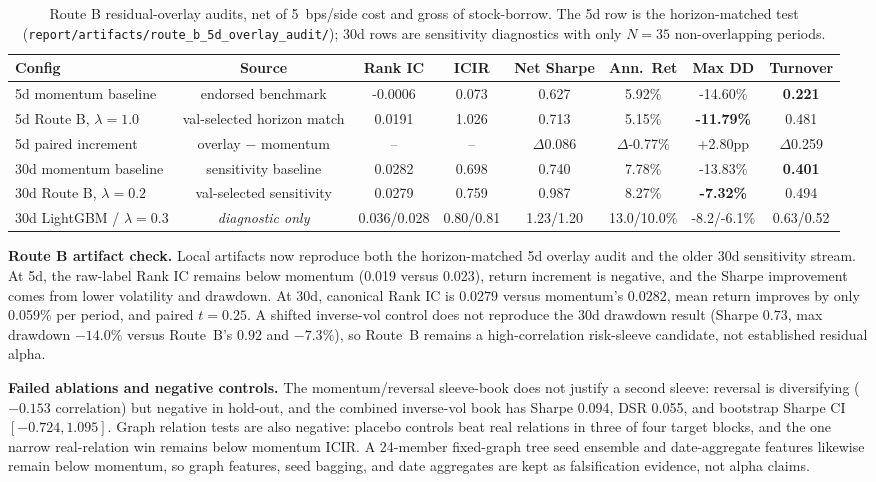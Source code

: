 \documentclass[9pt]{extarticle}
\begin{document}
\begin{table}[H]
  \centering
  \caption{Route B residual-overlay audits, net of 5~bps/side cost and gross of
  stock-borrow. The 5d row is the horizon-matched test
  (\texttt{report/artifacts/route\_b\_5d\_overlay\_audit/}); 30d rows are
  sensitivity diagnostics with only $N=35$ non-overlapping periods.}\label{tab:route_b_30d}
  \scriptsize
  \setlength{\tabcolsep}{3pt}
  \begin{tabular}{lccccccc}
    \toprule
    Config & Source & Rank IC & ICIR & Net Sharpe & Ann.\ Ret & Max DD & Turnover \\
    \midrule
    5d momentum baseline & endorsed benchmark & -0.0006 & 0.073 & 0.627 & 5.92\% & -14.60\% & \textbf{0.221} \\
    5d Route B, $\lambda=1.0$ & val-selected horizon match & 0.0191 & 1.026 & 0.713 & 5.15\% & \textbf{-11.79\%} & 0.481 \\
    5d paired increment & overlay $-$ momentum & -- & -- & $\Delta$0.086 & $\Delta$-0.77\% & +2.80pp & $\Delta$0.259 \\
    \midrule
    30d momentum baseline & sensitivity baseline & 0.0282 & 0.698 & 0.740 & 7.78\% & -13.83\% & \textbf{0.401} \\
    30d Route B, $\lambda=0.2$ & val-selected sensitivity & 0.0279 & 0.759 & 0.987 & 8.27\% & \textbf{-7.32\%} & 0.494 \\
    30d LightGBM / $\lambda=0.3$ & \emph{diagnostic only} & 0.036/0.028 & 0.80/0.81 & 1.23/1.20 & 13.0/10.0\% & -8.2/-6.1\% & 0.63/0.52 \\
    \bottomrule
  \end{tabular}
\end{table}

\textbf{Route B artifact check.} Local artifacts now reproduce both the
horizon-matched 5d overlay audit and the older 30d sensitivity stream. At 5d,
the raw-label Rank IC remains below momentum (0.019 versus 0.023), return
increment is negative, and the Sharpe improvement comes from lower volatility
and drawdown.
At 30d, canonical Rank IC is $0.0279$ versus momentum's $0.0282$, mean return
improves by only 0.059\% per period, and paired $t=0.25$. A shifted inverse-vol
control does not reproduce the 30d drawdown result (Sharpe $0.73$, max drawdown
$-14.0\%$ versus Route~B's $0.92$ and $-7.3\%$), so Route~B remains a
high-correlation risk-sleeve candidate, not established residual alpha.

\textbf{Failed ablations and negative controls.} The momentum/reversal
sleeve-book does not justify a second sleeve: reversal is diversifying
($-0.153$ correlation) but negative in hold-out, and the combined inverse-vol
book has Sharpe 0.094, DSR 0.055, and bootstrap Sharpe CI $[-0.724,1.095]$.
Graph relation tests are also negative: placebo controls beat real relations in
three of four target blocks, and the one narrow real-relation win remains below
momentum ICIR. A 24-member fixed-graph tree seed ensemble and date-aggregate
features likewise remain below momentum, so graph features, seed bagging, and
date aggregates are kept as falsification evidence, not alpha claims.
\end{document}
